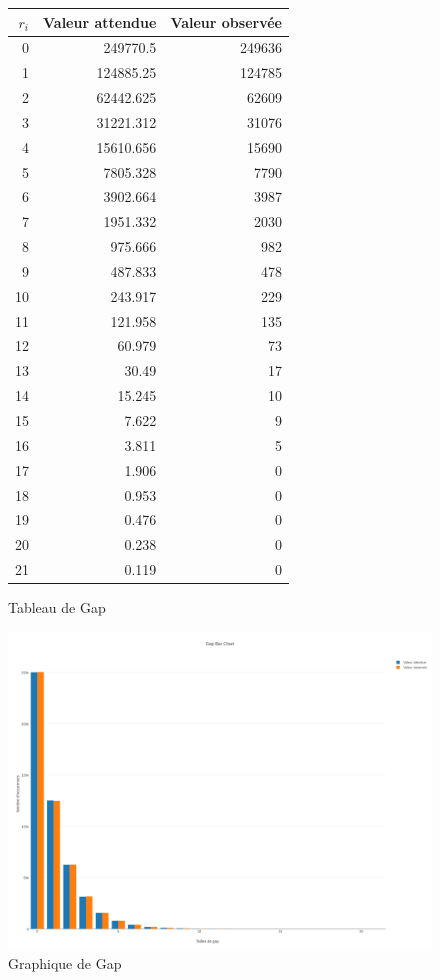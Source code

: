 \documentclass[10pt,a4paper]{article}
\begin{document}
\begin{figure}[h]
\centering
\begin{tabular}{|r|r|r|}
\hline
$r_i$ & Valeur attendue & Valeur observée\\
\hline
0 & 249770.5 & 249636\\
1 & 124885.25 & 124785\\
2 & 62442.625 & 62609\\
3 & 31221.312 & 31076\\
4 & 15610.656 & 15690\\
5 & 7805.328 & 7790\\
6 & 3902.664 & 3987\\
7 & 1951.332 & 2030\\
8 & 975.666 & 982\\
9 & 487.833 & 478\\
10 & 243.917 & 229\\
11 & 121.958 & 135\\
12 & 60.979 & 73\\
13 & 30.49 & 17\\
14 & 15.245 & 10\\
15 & 7.622 & 9\\
16 & 3.811 & 5\\
17 & 1.906 & 0\\
18 & 0.953 & 0\\
19 & 0.476 & 0\\
20 & 0.238 & 0\\
21 & 0.119 & 0\\
\hline
\end{tabular}
\caption{Tableau de Gap}
\end{figure}

\begin{figure}[h]
\centering
\includegraphics[scale=0.20]{../chart_images/gap_bar_chart.png}
\caption{Graphique de Gap}
\end{figure}
\end{document}
